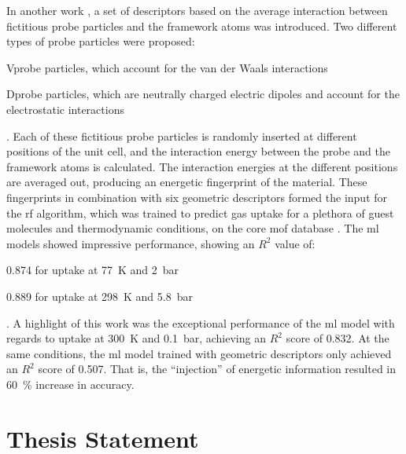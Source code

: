 In another work \parencite{generic}, a set of descriptors based on the average
interaction between fictitious probe particles and the
framework atoms was introduced. Two different types of probe particles were
proposed:
\begin{enumerate*}[label=\roman*).]
	\item Vprobe particles, which account for the van der Waals
		interactions
	\item Dprobe particles, which are neutrally charged electric dipoles and
		account for the electrostatic interactions
\end{enumerate*}.
Each of these fictitious probe particles is randomly inserted at different
positions of the unit cell, and the interaction energy between the probe and the
framework atoms is calculated. The interaction energies at the different
positions are averaged out, producing an energetic fingerprint of the material. These fingerprints in combination with six
geometric descriptors formed the input for the \gls{rf}
algorithm, which was trained to predict gas uptake for a
plethora of guest molecules and thermodynamic
conditions, on the \gls{core} \gls{mof} database \parencite{chong47}. The \gls{ml} models showed
impressive performance, showing an $R^2$ value of:
\begin{enumerate*}[label=\roman*).]
	\item \num{0.874} for  uptake at \SI{77}{\kelvin} and \SI{2}{\bar}
	\item \num{0.889} for  uptake at \SI{298}{\kelvin} and
		\SI{5.8}{\bar}
\end{enumerate*}.
A highlight of this work was the exceptional performance of the \gls{ml} model
with regards to  uptake at \SI{300}{\kelvin} and \SI{0.1}{\bar},
achieving an $R^2$ score of \num{0.832}. At the same conditions, the \gls{ml}
model trained with geometric descriptors only achieved an $R^2$ score of
\num{0.507}. That is, the ``injection'' of energetic information resulted in
\SI{60}{\percent} increase in accuracy.

\section{Thesis Statement}

